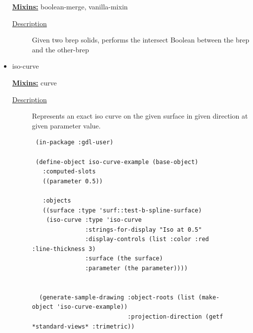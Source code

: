 \documentclass [11pt]{book}
\begin{document}
\begin{itemize}
\textbf{
\underline{Mixins:}} boolean-merge, vanilla-mixin





\begin{description}

\item [
\underline{Description}]


Given two brep solids, performs the intersect Boolean between the brep and the other-brep



\end{description}









\item {}iso-curve


\textbf{
\underline{Mixins:}} curve





\begin{description}

\item [
\underline{Description}]


Represents an exact iso curve on the given surface in given direction at given parameter value.



\end{description}




\begin{figure}
\begin{lrbox}{\boxedverb}
\begin{minipage}{\linewidth}
{\small

\begin{verbatim}
 (in-package :gdl-user)

 (define-object iso-curve-example (base-object)
   :computed-slots
   ((parameter 0.5))
  
   :objects
   ((surface :type 'surf::test-b-spline-surface)
    (iso-curve :type 'iso-curve
               :strings-for-display "Iso at 0.5"
               :display-controls (list :color :red :line-thickness 3)
               :surface (the surface)
               :parameter (the parameter))))


  (generate-sample-drawing :object-roots (list (make-object 'iso-curve-example))
                           :projection-direction (getf *standard-views* :trimetric))


\end{verbatim}}
\end{minipage}
\end{lrbox}
\end{figure}
\end{itemize}
\end{document}
